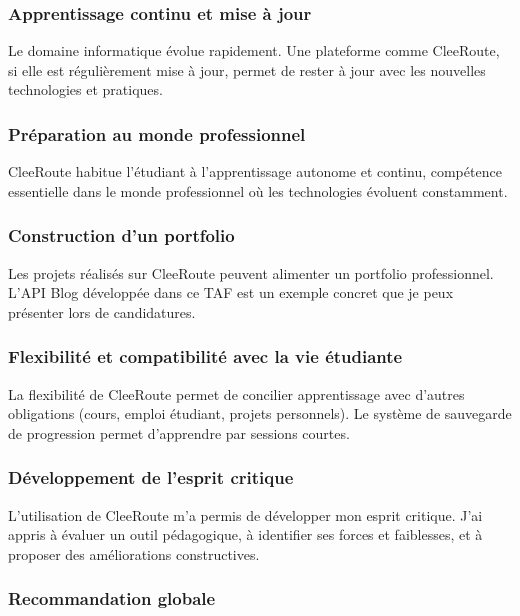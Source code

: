 \documentclass[12pt,a4paper]{article}
\begin{document}
\subsubsection{Apprentissage continu et mise à jour}

Le domaine informatique évolue rapidement. Une plateforme comme CleeRoute, si elle est régulièrement mise à jour, permet de rester à jour avec les nouvelles technologies et pratiques.

\subsubsection{Préparation au monde professionnel}

CleeRoute habitue l'étudiant à l'apprentissage autonome et continu, compétence essentielle dans le monde professionnel où les technologies évoluent constamment.

\subsubsection{Construction d'un portfolio}

Les projets réalisés sur CleeRoute peuvent alimenter un portfolio professionnel. L'API Blog développée dans ce TAF est un exemple concret que je peux présenter lors de candidatures.

\subsubsection{Flexibilité et compatibilité avec la vie étudiante}

La flexibilité de CleeRoute permet de concilier apprentissage avec d'autres obligations (cours, emploi étudiant, projets personnels). Le système de sauvegarde de progression permet d'apprendre par sessions courtes.

\subsubsection{Développement de l'esprit critique}

L'utilisation de CleeRoute m'a permis de développer mon esprit critique. J'ai appris à évaluer un outil pédagogique, à identifier ses forces et faiblesses, et à proposer des améliorations constructives.

\subsubsection{Recommandation globale}
\end{document}
